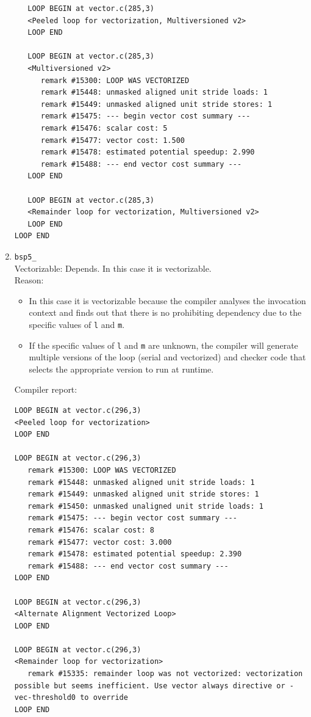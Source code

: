 \documentclass[11pt]{article}
\begin{document}
\begin{enumerate}
\begin{lstlisting}
   LOOP BEGIN at vector.c(285,3)
   <Peeled loop for vectorization, Multiversioned v2>
   LOOP END

   LOOP BEGIN at vector.c(285,3)
   <Multiversioned v2>
      remark #15300: LOOP WAS VECTORIZED
      remark #15448: unmasked aligned unit stride loads: 1 
      remark #15449: unmasked aligned unit stride stores: 1 
      remark #15475: --- begin vector cost summary ---
      remark #15476: scalar cost: 5 
      remark #15477: vector cost: 1.500 
      remark #15478: estimated potential speedup: 2.990 
      remark #15488: --- end vector cost summary ---
   LOOP END

   LOOP BEGIN at vector.c(285,3)
   <Remainder loop for vectorization, Multiversioned v2>
   LOOP END
LOOP END
\end{lstlisting}

\item \texttt{bsp5\_}\\
Vectorizable: Depends. In this case it is vectorizable.\\
Reason:
\begin{itemize}
\item In this case it is vectorizable because the compiler analyses the invocation context and finds out that there is no prohibiting dependency due to the specific values of \texttt{l} and \texttt{m}.
\item If the specific values of \texttt{l} and \texttt{m} are unknown, the compiler will generate multiple versions of the loop (serial and vectorized) and checker code that selects the appropriate version to run at runtime.
\end{itemize}
Compiler report:
\begin{lstlisting}
LOOP BEGIN at vector.c(296,3)
<Peeled loop for vectorization>
LOOP END

LOOP BEGIN at vector.c(296,3)
   remark #15300: LOOP WAS VECTORIZED
   remark #15448: unmasked aligned unit stride loads: 1 
   remark #15449: unmasked aligned unit stride stores: 1 
   remark #15450: unmasked unaligned unit stride loads: 1 
   remark #15475: --- begin vector cost summary ---
   remark #15476: scalar cost: 8 
   remark #15477: vector cost: 3.000 
   remark #15478: estimated potential speedup: 2.390 
   remark #15488: --- end vector cost summary ---
LOOP END

LOOP BEGIN at vector.c(296,3)
<Alternate Alignment Vectorized Loop>
LOOP END

LOOP BEGIN at vector.c(296,3)
<Remainder loop for vectorization>
   remark #15335: remainder loop was not vectorized: vectorization possible but seems inefficient. Use vector always directive or -vec-threshold0 to override 
LOOP END
\end{lstlisting}


\end{enumerate}
\end{document}

